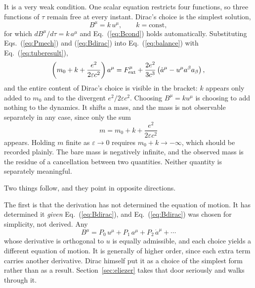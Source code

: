 \documentclass[preprint]{aastex701}
\begin{document}
It is a very weak condition. One scalar equation restricts four functions, so
three functions of $\tau$ remain free at every instant. Dirac's choice is the
simplest solution,
\begin{equation}
B^\mu = k\,u^\mu, \qquad k = \text{const},
\label{eq:Bdirac}
\end{equation}
for which $dB^\mu/d\tau = k\,a^\mu$ and Eq.~(\ref{eq:Bcond}) holds
automatically. Substituting Eqs.~(\ref{eq:Pmech}) and (\ref{eq:Bdirac}) into
Eq.~(\ref{eq:balance}) with Eq.~(\ref{eq:tuberesult}),
\begin{equation}
\left(m_0 + k + \frac{e^2}{2\varepsilon c^2}\right)a^\mu
= F^\mu_{\rm ext} + \frac{2e^2}{3c^3}\left(\dot a^\mu - u^\mu a^\beta a_\beta\right),
\label{eq:preLD}
\end{equation}
and the entire content of Dirac's choice is visible in the bracket: $k$ appears
only added to $m_0$ and to the divergent $e^2/2\varepsilon c^2$. Choosing
$B^\mu = k u^\mu$ is choosing to add nothing to the dynamics. It shifts a mass,
and the mass is not observable separately in any case, since only the sum
\begin{equation}
m = m_0 + k + \frac{e^2}{2\varepsilon c^2}
\label{eq:massren2}
\end{equation}
appears. Holding $m$ finite as $\varepsilon\to0$ requires $m_0 + k \to -\infty$,
which should be recorded plainly. The bare mass is negatively infinite, and the
observed mass is the residue of a cancellation between two quantities. Neither
quantity is separately meaningful.

Two things follow, and they point in opposite directions.

The first is that the derivation has not determined the equation of motion. It
has determined it \emph{given} Eq.~(\ref{eq:Bdirac}), and
Eq.~(\ref{eq:Bdirac}) was chosen for simplicity, not derived. Any
\begin{equation}
B^\mu = P_0\,u^\mu + P_1\,a^\mu + P_2\,\dot a^\mu + \cdots
\label{eq:Bgeneral}
\end{equation}
whose derivative is orthogonal to $u$ is equally admissible, and each choice
yields a different equation of motion. It is generally of higher order, since
each extra term carries another derivative. Dirac himself put it as a choice of the
simplest form rather than as a result. Section~\ref{sec:eliezer} takes that door
seriously and walks through it.
\end{document}
